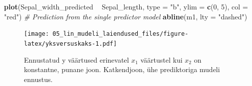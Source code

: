 \documentclass[]{book}
\newenvironment{Shaded}{\begin{snugshade}}{\end{snugshade}}
\newcommand{\KeywordTok}[1]{\textcolor[rgb]{0.13,0.29,0.53}{\textbf{#1}}}
\newcommand{\DataTypeTok}[1]{\textcolor[rgb]{0.13,0.29,0.53}{#1}}
\newcommand{\DecValTok}[1]{\textcolor[rgb]{0.00,0.00,0.81}{#1}}
\newcommand{\StringTok}[1]{\textcolor[rgb]{0.31,0.60,0.02}{#1}}
\newcommand{\CommentTok}[1]{\textcolor[rgb]{0.56,0.35,0.01}{\textit{#1}}}
\newcommand{\OperatorTok}[1]{\textcolor[rgb]{0.81,0.36,0.00}{\textbf{#1}}}
\newcommand{\NormalTok}[1]{#1}
\begin{document}
\begin{Shaded}
\end{Shaded}





\begin{Shaded}
\begin{Highlighting}[]
\KeywordTok{plot}\NormalTok{(Sepal_width_predicted }\OperatorTok{~}\StringTok{ }\NormalTok{Sepal_length, }\DataTypeTok{type =} \StringTok{"b"}\NormalTok{, }\DataTypeTok{ylim =} \KeywordTok{c}\NormalTok{(}\DecValTok{0}\NormalTok{, }\DecValTok{5}\NormalTok{), }\DataTypeTok{col =} \StringTok{"red"}\NormalTok{)}
\CommentTok{# Prediction from the single predictor model}
\KeywordTok{abline}\NormalTok{(m1, }\DataTypeTok{lty =} \StringTok{"dashed"}\NormalTok{)}
\end{Highlighting}
\end{Shaded}

\begin{figure}
\centering
\texttt{[image: 05\_lin\_mudeli\_laiendused\_files/figure-latex/yksversuskaks-1.pdf]}
\caption{\label{fig:yksversuskaks}Ennustatud y väärtused erinevatel \(x_1\) väärtustel
kui \(x_2\) on konstantne, punane joon. Katkendjoon, ühe prediktoriga
mudeli ennustus.}
\end{figure}
\end{document}
